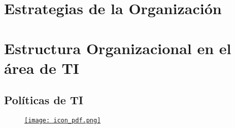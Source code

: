 \section{Estrategias de la Organización }
\section{Estructura Organizacional en el área de TI}


\subsection{Políticas de TI}
    \begin{figure}[!ht]
        \centering
        \href{https://klintex.com.pe/wp-content/uploads/2021/12/Politica-Privacidad_-Klintex.pdf}{
                \texttt{[image: icon\_pdf.png]}
                }
    \end{figure}    

